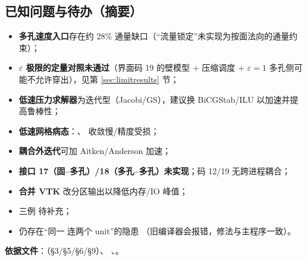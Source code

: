 \subsection{已知问题与待办（摘要）}
\begin{itemize}
  \item \textbf{多孔速度入口}存在约 28\% 通量缺口（“流量锁定”未实现为按面法向的通量约束）；
  \item \textbf{$\varepsilon$ 极限的定量对照未通过}（界面码 19 的壁模型 + 压缩调度 +
        $\varepsilon=1$ 多孔侧可能不允许穿出），见第 \ref{sec:limitresults} 节；
  \item \textbf{低速压力求解器}为迭代型（Jacobi/GS），建议换 BiCGStab/ILU 以加速并提高鲁棒性；
  \item \textbf{低速网格病态}：、 收敛慢/精度受损；
  \item \textbf{耦合外迭代}可加 Aitken/Anderson 加速；
  \item \textbf{接口 17（固--多孔）/18（多孔--多孔）未实现}；码 12/19 无跨进程耦合；
  \item \textbf{合并 VTK} 改分区输出以降低内存/IO 峰值；
  \item 三例  待补充；
  \item {} 仍存在“同一  连两个 unit”的隐患
        （旧编译器会报错，修法与主程序一致）。
\end{itemize}

\noindent\textbf{依据文件}：（§3/§5/§6/§9）、
、。

